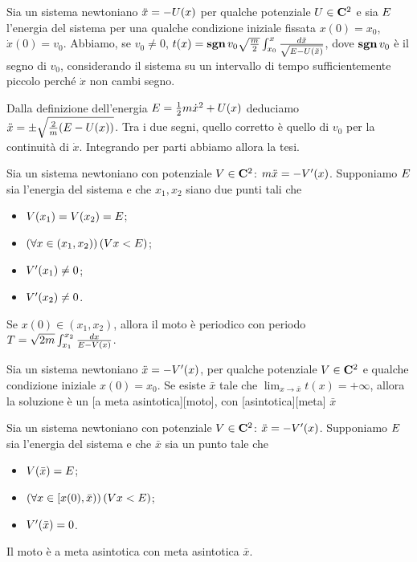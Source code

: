 \begin{Theorem}
	Sia un sistema newtoniano $\ddot{x} = - U(x)$ per qualche potenziale $\Potential \in \CClass{2}$ e sia $E$ l'energia del sistema per una qualche condizione iniziale fissata $x(0) = x_0$, $\dot{x}(0) = v_0$. Abbiamo, se $v_0 \neq 0$, $t(x) = \operatorname{\textbf{sgn}}{v_0} \sqrt{\frac{m}{2}} \int_{x_0}^x \frac{d\tilde{x}}{\sqrt{E - U(\tilde{x})}}$, dove $\operatorname{\textbf{sgn}}{v_0}$ \`e il segno di $v_0$, considerando il sistema su un intervallo di tempo sufficientemente piccolo perch\'e $\dot{x}$ non cambi segno.
\end{Theorem}
\Proof Dalla definizione dell'energia $E = \frac{1}{2} m \dot{x}^2 + U(x)$ deduciamo $\ddot{x} = \pm \sqrt{\frac{2}{m} ( E - U(x) )}$. Tra i due segni, quello corretto \`e quello di $v_0$ per la continuit\`a di $\dot{x}$. Integrando per parti abbiamo allora la tesi. \EndProof
\begin{Theorem}
	Sia un sistema newtoniano con potenziale $\PotentialEnergy \in \CClass{2}$: $m \ddot{x} = - V'(x)$. Supponiamo $E$ sia l'energia del sistema e che $x_1, x_2$ siano due punti tali che
	\begin{itemize}
		\item $V(x_1) = V(x_2) = E$;
		\item $\left ( \forall x \in (x_1,x_2) \right ) \left ( V{x} < E \right )$;
		\item $V'(x_1) \neq 0$;
		\item $V'(x_2) \neq 0$.
	\end{itemize}
	Se $x(0) \in (x_1,x_2)$, allora il moto \`e periodico con periodo $T = \sqrt{2m} \int_{x_1}^{x_2} \frac{dx}{E - V(x)}$.
\end{Theorem}
\begin{Definition}
	Sia un sistema newtoniano $\ddot{x} = - V'(x)$, per qualche potenziale $\PotentialEnergy \in \CClass{2}$ e qualche condizione iniziale $x(0) = x_0$. Se esiste $\bar{x}$ tale che $\lim_{x \rightarrow \bar{x}} t(x) = + \infty$, allora la soluzione \`e un [a meta asintotica][moto], con [asintotica][meta] $\bar{x}$
\end{Definition}
\begin{Theorem}
	Sia un sistema newtoniano con potenziale $\PotentialEnergy \in \CClass{2}$: $\ddot{x} = - V'(x)$. Supponiamo $E$ sia l'energia del sistema e che $\bar{x}$ sia un punto tale che
	\begin{itemize}
		\item $V(\bar{x}) = E$;
		\item $\left ( \forall x \in [x(0),\bar{x}) \right ) \left ( V{x} < E \right )$;
		\item $V'(\bar{x}) = 0$.
	\end{itemize}
	Il moto \`e a meta asintotica con meta asintotica $\bar{x}$.
\end{Theorem}
